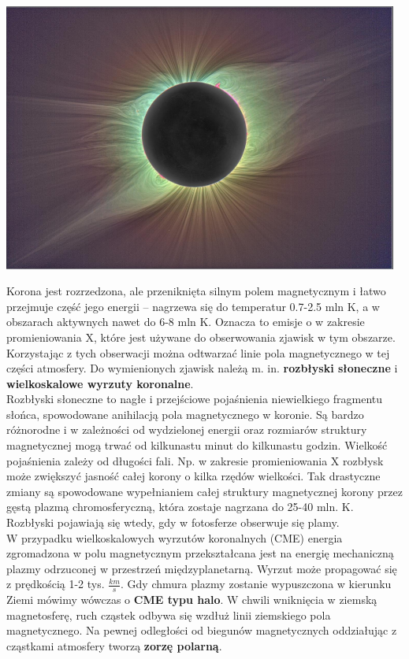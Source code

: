 \documentclass[../index.tex]{subfiles}
\begin{document}
        \begin{center}
            \includegraphics[width=13cm]{images/koronaSloneczna.png}
        \end{center}
        Korona jest rozrzedzona, ale przeniknięta silnym polem magnetycznym i łatwo przejmuje część jego energii – nagrzewa się do temperatur 0.7-2.5 mln K, a w obszarach aktywnych nawet do 6-8 mln K. Oznacza to emisje o w zakresie promieniowania X, które jest używane do obserwowania zjawisk w tym obszarze. Korzystając z tych obserwacji można odtwarzać linie pola magnetycznego w tej części atmosfery. Do wymienionych zjawisk należą m. in. \textbf{rozbłyski słoneczne} i \textbf{wielkoskalowe wyrzuty koronalne}.\\
        Rozbłyski słoneczne to nagłe i przejściowe pojaśnienia niewielkiego fragmentu słońca, spowodowane anihilacją pola magnetycznego w koronie. Są bardzo różnorodne i w zależności od wydzielonej energii oraz rozmiarów struktury magnetycznej mogą trwać od kilkunastu minut do kilkunastu godzin. Wielkość pojaśnienia zależy od długości fali. Np. w zakresie promieniowania X rozbłysk może zwiększyć jasność całej korony o kilka rzędów wielkości. Tak drastyczne zmiany są spowodowane wypełnianiem całej struktury magnetycznej korony przez gęstą plazmą chromosferyczną, która zostaje nagrzana do 25-40 mln. K. Rozbłyski pojawiają się wtedy, gdy w fotosferze obserwuje się plamy.\\
        W przypadku wielkoskalowych wyrzutów koronalnych (CME) energia zgromadzona w polu magnetycznym przekształcana jest na energię mechaniczną plazmy odrzuconej w przestrzeń międzyplanetarną. Wyrzut może propagować się z prędkością 1-2 tys. \(\frac{km}{s}\). Gdy chmura plazmy zostanie wypuszczona w kierunku Ziemi mówimy wówczas o \textbf{CME typu halo}. W chwili wniknięcia w ziemską magnetosferę, ruch cząstek odbywa się wzdłuż linii ziemskiego pola magnetycznego. Na pewnej odległości od biegunów magnetycznych oddziałując z cząstkami atmosfery tworzą \textbf{zorzę polarną}.\\
\end{document}
